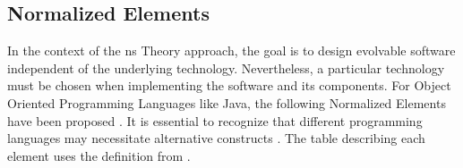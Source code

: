 \subsection{Normalized Elements} \label{subsec_ns_elements} 

In the context of the \gls{ns} Theory approach, the goal is to design evolvable software
independent of the underlying technology. Nevertheless, a particular technology must be
chosen when implementing the software and its components. For Object Oriented Programming
Languages like Java, the following Normalized Elements have been proposed
\parencite[363-398]{mannaert_normalized_2016}. It is essential to recognize that different
programming languages may necessitate alternative constructs
\parencite[364]{mannaert_normalized_2016}. The table describing each element uses the
definition from \textcite{mannaert_towards_2012}.

